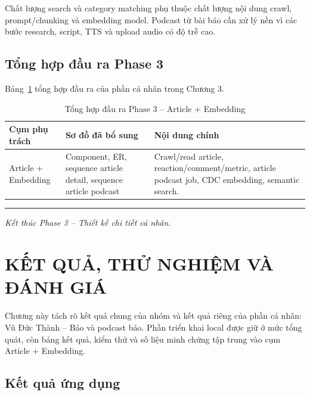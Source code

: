\documentclass[14pt,a4paper,oneside]{extreport}
\begin{document}
Chất lượng search và category matching phụ thuộc chất lượng nội dung crawl, prompt/chunking và embedding model. Podcast từ bài báo cần xử lý nền vì các bước research, script, TTS và upload audio có độ trễ cao.


\section{Tổng hợp đầu ra Phase 3}
\label{sec:phase3-summary}

Bảng~\ref{tab:phase3-output} tổng hợp đầu ra của phần cá nhân trong Chương 3.

\begin{table}[H]
\centering
\caption{Tổng hợp đầu ra Phase 3 -- Article + Embedding}
\label{tab:phase3-output}
\renewcommand{\arraystretch}{1.3}
\scriptsize
\begin{tabularx}{\textwidth}{|l|X|X|}
\hline
\textbf{Cụm phụ trách} & \textbf{Sơ đồ đã bổ sung} & \textbf{Nội dung chính} \\
\hline
Article + Embedding & Component, ER, sequence article detail, sequence article podcast & Crawl/read article, reaction/comment/metric, article podcast job, CDC embedding, semantic search. \\
\hline
\end{tabularx}
\end{table}

\vspace{1cm}
\noindent\rule{\textwidth}{0.4pt}

\noindent
\textit{Kết thúc Phase 3 -- Thiết kế chi tiết cá nhân.}

\clearpage

\chapter{KẾT QUẢ, THỬ NGHIỆM VÀ ĐÁNH GIÁ}
\label{chap:ket-qua}

Chương này tách rõ kết quả chung của nhóm và kết quả riêng của phần cá nhân: Vũ Đức Thành -- Báo và podcast báo. Phần triển khai local được giữ ở mức tổng quát, còn bảng kết quả, kiểm thử và số liệu minh chứng tập trung vào cụm Article + Embedding.

\section{Kết quả ứng dụng}
\label{sec:ket-qua-ung-dung}
\end{document}
